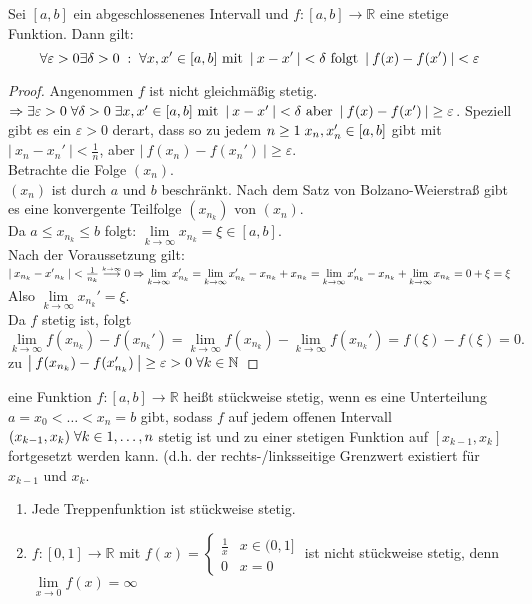\documentclass[a4paper,titlepage,oneside]{article}
\def\N{\ensuremath{\mathbb{N}} }
\def\R{\ensuremath{\mathbb{R}} }
\renewcommand{\epsilon}{\ensuremath{\varepsilon} }
\def\WSP{\text{Widerspruch! }}
\def\fa{\ensuremath{\forall}}
\def\sp{\hspace{0,1cm}}
\renewcommand{\liminf}[2][n]{\ensuremath{\lim\limits_{#1 \rightarrow \infty}{#2}}}
\newcommand{\limnull}[2][n]{\ensuremath{\lim\limits_{#1 \rightarrow 0}{#2}}}
\newcommand{\abs}[1]{\ensuremath{\left|\:#1\:\right|}}
\newcommand{\longtoinf}[1][n]{\ensuremath{\overset{\scriptscriptstyle{#1 \to \infty}}{\longrightarrow}}}
\theoremstyle{thmstyle}
\begin{document}
\begin{satz}
Sei $[a,b]$ ein abgeschlossenenes Intervall und $ f: [a,b] \to \R $ eine stetige Funktion. Dann gilt: 
\[\forall \epsilon > 0 \exists \delta > 0 \sp: \sp \forall x, x' \in [a,b] \text{ mit } \abs{x- x'} < \delta \text{ folgt } \abs{f(x) - f(x')} < \epsilon\]
\begin{proof}
Angenommen $f$ ist nicht gleichmäßig stetig. $\Rightarrow \exists \epsilon > 0 \sp \forall \delta > 0 \sp \exists x,x' \in [a,b] \text{ mit } \abs{x- x'} < \delta \text{ aber } \abs{f(x) - f(x')} \ge \epsilon$. Speziell gibt es ein $\epsilon > 0$ derart, dass so zu jedem $n \ge 1 \sp x_n, x_n' \in [a,b] $ gibt mit $\abs{x_n - x_n'} < \frac{1}{n}$, aber $\abs{f(x_n) - f(x_n')} \ge \epsilon$.\\
Betrachte die Folge $(x_n)$.\\
$(x_n)$ ist durch $a$ und $b$ beschränkt. Nach dem Satz von Bolzano-Weierstraß gibt es eine konvergente Teilfolge $(x_{n_k})$ von $(x_n)$.\\
Da $a \le x_{n_k} \le b$ folgt: $\liminf[k]{x_{n_k}} = \xi \in [a,b]$.\\
Nach der Voraussetzung gilt:
$\abs{x_{n_k} - {x'}_{n_k}} < \frac{1}{n_k} \longtoinf[k] 0\\
\Rightarrow \liminf[k]{x_{n_k}'} = \liminf[k]{x_{n_k}' - x_{n_k} + x_{n_k}} =  \liminf[k]{x_{n_k}' - x_{n_k}} + \liminf[k]{x_{n_k}} = 0 + \xi = \xi$\\
Also  $\liminf[k]{x_{n_k}'} = \xi$.\\
Da $f$ stetig ist, folgt $\liminf[k]{f(x_{n_k}) - f(x_{n_k}')} = \liminf[k]{f(x_{n_k})} - \liminf[k]{f(x_{n_k}')} = f(\xi) - f(\xi) = 0. $\\
\WSP zu $\abs{f(x_{n_k}) - f(x_{n_k}')} \ge \epsilon > 0 \sp \forall k \in \N$
\end{proof}
\end{satz}

\begin{defi}
eine Funktion $f: [a,b] \to \R$ heißt stückweise stetig, wenn es eine Unterteilung $a = x_0 < \dots < x_n = b$ gibt, sodass $f$ auf jedem offenen Intervall $(x_{k-1}, x_k)  \sp \fa k \in {1, \dots, n} $ stetig ist und zu einer stetigen Funktion auf $[x_{k-1}, x_k]$ fortgesetzt werden kann. (d.h. der rechts-/linksseitige Grenzwert existiert für $x_{k-1}$ und $x_k$.
\end{defi}

\begin{bsp}
\begin{enumerate}
\item Jede Treppenfunktion ist stückweise stetig.
\item $f:[0,1] \to \R$ mit $f(x) = \begin{cases} \frac{1}{x} & x \in(0,1]\\ 0 & x = 0\end{cases}$ ist nicht stückweise stetig, denn $\limnull[x]{f(x)} = \infty$
\end{enumerate}
\end{bsp}
\end{document}
